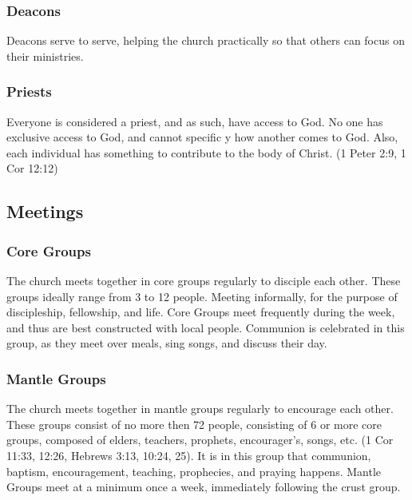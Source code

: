 \subsubsection{Deacons}

Deacons serve to serve, helping the church practically so that others can focus on their ministries.



\subsubsection{Priests}

Everyone is considered a priest, and as such, have access to God. No one has exclusive access to God, and cannot specific y how another comes to God. Also, each individual has something to contribute to the body of Christ. (1 Peter 2:9, 1 Cor 12:12)



\subsection{Meetings}



\subsubsection{Core Groups}

The church meets together in core groups regularly to disciple each other. These groups ideally range from 3 to 12 people. Meeting informally, for the purpose of discipleship, fellowship, and life. Core Groups meet frequently during the week, and thus are best constructed with local people. Communion is celebrated in this group, as they meet over meals, sing songs, and discuss their day.



\subsubsection{Mantle Groups}

The church meets together in mantle groups regularly to encourage each other. These groups consist of no more then 72 people, consisting of 6 or more core groups, composed of elders, teachers, prophets, encourager’s, songs, etc. (1 Cor 11:33, 12:26, Hebrews 3:13, 10:24, 25). It is in this group that communion, baptism, encouragement, teaching, prophecies, and praying happens. Mantle Groups meet at a minimum once a week, immediately following the crust group.



